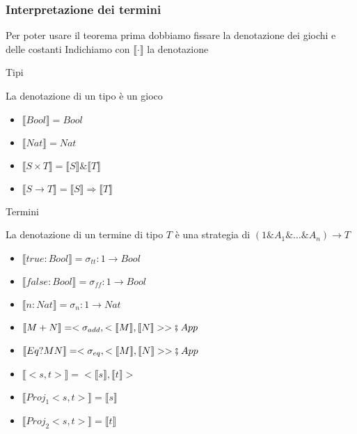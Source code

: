 \documentclass{beamer}
\begin{document}
\begin{frame}
	
	\frametitle{Interpretazione dei termini}
	
	Per poter usare il teorema prima dobbiamo fissare la denotazione dei giochi e delle costanti
	Indichiamo con $\llbracket \cdot \rrbracket$ la denotazione
	
	\begin{block}{Tipi}
		
		La denotazione di un tipo è un gioco
		
		\begin{itemize}
			\item $\llbracket Bool \rrbracket = Bool$
			\item $\llbracket Nat \rrbracket = Nat$
			\item $\llbracket S \times T \rrbracket = \llbracket S \rrbracket \& \llbracket T \rrbracket$
			\item $\llbracket S \rightarrow T \rrbracket = \llbracket S \rrbracket \Rightarrow \llbracket T \rrbracket$
		\end{itemize}
	\end{block}
	
	
	
\end{frame}

\begin{frame}
	
	\begin{block}{Termini}
		
		\small
		
		La denotazione di un termine di tipo $T$ è una strategia di $(1\& A_1 \& \dots \& A_n)\rightarrow T$
		
		\begin{itemize}
			\item $\llbracket true : Bool \rrbracket = \sigma_{tt} : 1 \rightarrow Bool$
			\item $\llbracket false : Bool \rrbracket = \sigma_{ff} : 1 \rightarrow Bool$
			\item $\llbracket n : Nat \rrbracket = \sigma_n : 1 \rightarrow Nat$
			\item $\llbracket M + N \rrbracket = < \sigma_{add} , < \llbracket M \rrbracket , \llbracket N \rrbracket > > \fatsemi \; App$
			\item $\llbracket Eq? M N \rrbracket = < \sigma_{eq} , < \llbracket M \rrbracket , \llbracket N \rrbracket > > \fatsemi \; App$
			\item $\llbracket < s ,t > \rrbracket = <\llbracket s \rrbracket , \llbracket t \rrbracket>$
			\item $\llbracket Proj_1<s,t> \rrbracket = \llbracket s \rrbracket$
			\item $\llbracket Proj_2<s,t> \rrbracket = \llbracket t \rrbracket$
		\end{itemize}

	\end{block}

	
\end{frame}
\end{document}
